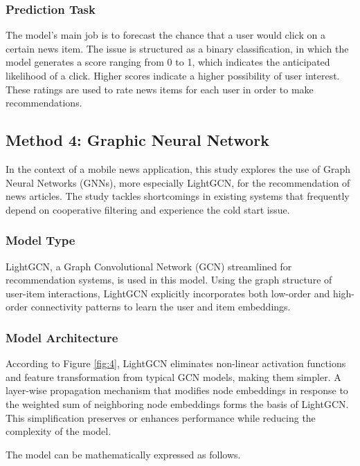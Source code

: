\documentclass[9pt,twocolumn,twoside,lineno]{gsajnl}
\begin{document}
\subsubsection{Prediction Task\newline}
The model's main job is to forecast the chance that a user would click on a certain news item. The issue is structured as a binary classification, in which the model generates a score ranging from 0 to 1, which indicates the anticipated likelihood of a click. Higher scores indicate a higher possibility of user interest. These ratings are used to rate news items for each user in order to make recommendations.

\subsection{Method 4: Graphic Neural Network}
In the context of a mobile news application, this study explores the use of Graph Neural Networks (GNNs), more especially LightGCN, for the recommendation of news articles. The study tackles shortcomings in existing systems that frequently depend on cooperative filtering and experience the cold start issue.

\subsubsection{Model Type\newline}
LightGCN, a Graph Convolutional Network (GCN) streamlined for recommendation systems, is used in this model. Using the graph structure of user-item interactions, LightGCN explicitly incorporates both low-order and high-order connectivity patterns to learn the user and item embeddings.

\subsubsection{Model Architecture\newline}
According to Figure \ref{fig:4}, LightGCN eliminates non-linear activation functions and feature transformation from typical GCN models, making them simpler. A layer-wise propagation mechanism that modifies node embeddings in response to the weighted sum of neighboring node embeddings forms the basis of LightGCN. This simplification preserves or enhances performance while reducing the complexity of the model.

The model can be mathematically expressed as follows.
\end{document}
